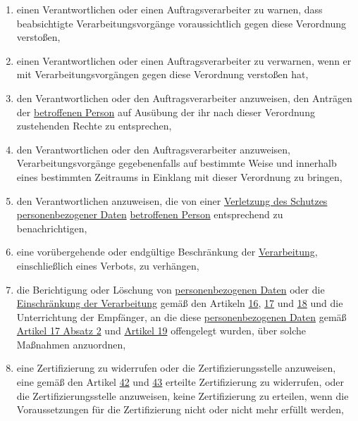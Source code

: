 \begin{enumerate}
  \begin{enumerate}
  
    \item einen Verantwortlichen oder einen Auftragsverarbeiter zu warnen, dass beabsichtigte Verarbeitungsvorgänge
     voraussichtlich gegen diese Verordnung verstoßen,
    \label{itm:58-2a}

    \item einen Verantwortlichen oder einen Auftragsverarbeiter zu verwarnen, wenn er mit Verarbeitungsvorgängen gegen
     diese Verordnung verstoßen hat,
    \label{itm:58-2b}

    \item den Verantwortlichen oder den Auftragsverarbeiter anzuweisen, den Anträgen der \hyperref[itm:04-1]{betroffenen Person} auf Ausübung
     der ihr nach dieser Verordnung zustehenden Rechte zu entsprechen,
    \label{itm:58-2c}

    \item den Verantwortlichen oder den Auftragsverarbeiter anzuweisen, Verarbeitungsvorgänge gegebenenfalls auf
     bestimmte Weise und innerhalb eines bestimmten Zeitraums in Einklang mit dieser Verordnung zu bringen,
    \label{itm:58-2d}

    \item den Verantwortlichen anzuweisen, die von einer \hyperref[itm:04-12]{Verletzung des Schutzes personenbezogener Daten} \hyperref[itm:04-1]{betroffenen
     Person} entsprechend zu benachrichtigen,
    \label{itm:58-2e}

    \item eine vorübergehende oder endgültige Beschränkung der \hyperref[itm:04-2]{Verarbeitung}, einschließlich eines Verbots, zu
     verhängen,
    \label{itm:58-2f}

    \item die Berichtigung oder Löschung von \hyperref[itm:04-1]{personenbezogenen Daten} oder die \hyperref[itm:04-3]{Einschränkung der Verarbeitung} gemäß den
     Artikeln \hyperref[ch:16]{16}, \hyperref[ch:17]{17} und \hyperref[ch:17]{18} und die Unterrichtung der Empfänger,
     an die diese \hyperref[itm:04-1]{personenbezogenen Daten} gemäß \hyperref[itm:17-2]{Artikel 17 Absatz 2} und \hyperref[ch:19]
     {Artikel 19} offengelegt wurden, über solche Maßnahmen anzuordnen,
    \label{itm:58-2g}

    \item eine Zertifizierung zu widerrufen oder die Zertifizierungsstelle anzuweisen, eine gemäß den Artikel \hyperref
     [ch:42]{42} und \hyperref[ch:43]{43} erteilte Zertifizierung zu widerrufen, oder die Zertifizierungsstelle
     anzuweisen, keine Zertifizierung zu erteilen, wenn die Voraussetzungen für die Zertifizierung nicht oder nicht
     mehr erfüllt werden,
    \label{itm:58-2h}


\end{enumerate}
\end{enumerate}
